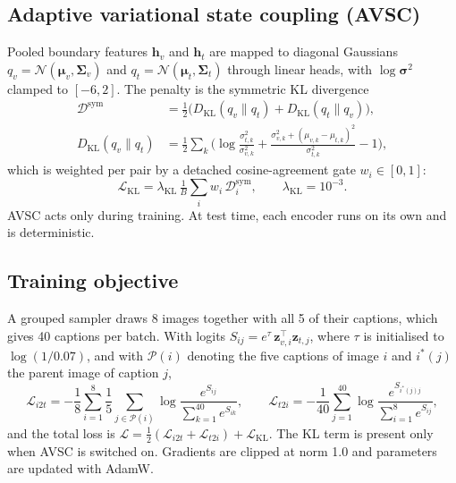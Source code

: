 \documentclass[pdflatex,sn-mathphys-num]{sn-jnl}
\begin{document}
\subsection{Adaptive variational state coupling (AVSC)}
Pooled boundary features $\mathbf{h}_v$ and $\mathbf{h}_t$ are mapped to diagonal Gaussians $q_v=\mathcal{N}(\bm\mu_v,\bm\Sigma_v)$ and $q_t=\mathcal{N}(\bm\mu_t,\bm\Sigma_t)$ through linear heads, with $\log\bm\sigma^2$ clamped to $[-6,2]$. The penalty is the symmetric KL divergence
\begin{equation}
\begin{aligned}
\mathcal{D}^{\mathrm{sym}}&=\tfrac12\big(D_{\mathrm{KL}}(q_v\|q_t)+D_{\mathrm{KL}}(q_t\|q_v)\big),\\
D_{\mathrm{KL}}(q_v\|q_t)&=\tfrac12\sum_{k}\Big(\log\tfrac{\sigma_{t,k}^2}{\sigma_{v,k}^2}+\tfrac{\sigma_{v,k}^2+(\mu_{v,k}-\mu_{t,k})^2}{\sigma_{t,k}^2}-1\Big),
\end{aligned}
\label{eq:kl}
\end{equation}
which is weighted per pair by a detached cosine-agreement gate $w_i\in[0,1]$:
\begin{equation}
\mathcal{L}_{\mathrm{KL}}=\lambda_{\mathrm{KL}}\,\tfrac1B\textstyle\sum_i w_i\,\mathcal{D}^{\mathrm{sym}}_i,\qquad \lambda_{\mathrm{KL}}=10^{-3}.
\end{equation}
AVSC acts only during training. At test time, each encoder runs on its own and is deterministic.

\subsection{Training objective}
A grouped sampler draws 8 images together with all 5 of their captions, which gives 40 captions per batch. With logits $S_{ij}=e^{\tau}\,\mathbf{z}_{v,i}^\top\mathbf{z}_{t,j}$, where $\tau$ is initialised to $\log(1/0.07)$, and with $\mathcal{P}(i)$ denoting the five captions of image $i$ and $i^*(j)$ the parent image of caption $j$,
\begin{equation}
\mathcal{L}_{i2t}=-\frac18\sum_{i=1}^{8}\frac{1}{5}\sum_{j\in\mathcal{P}(i)}\log\frac{e^{S_{ij}}}{\sum_{k=1}^{40}e^{S_{ik}}},\qquad
\mathcal{L}_{t2i}=-\frac1{40}\sum_{j=1}^{40}\log\frac{e^{S_{i^*(j)j}}}{\sum_{i=1}^{8}e^{S_{ij}}},
\label{eq:nce}
\end{equation}
and the total loss is $\mathcal{L}=\tfrac12(\mathcal{L}_{i2t}+\mathcal{L}_{t2i})+\mathcal{L}_{\mathrm{KL}}$. The KL term is present only when AVSC is switched on. Gradients are clipped at norm 1.0 and parameters are updated with AdamW.
\end{document}
